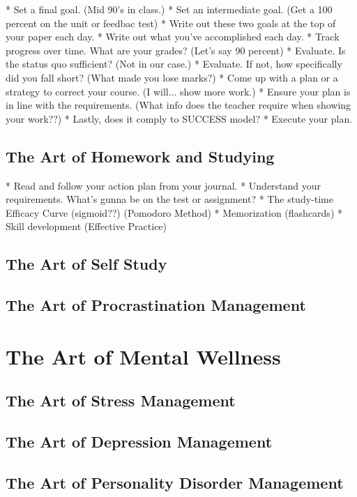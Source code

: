 \documentclass{book}
\begin{document}
* Set a final goal. (Mid 90's in class.)
* Set an intermediate goal. (Get a 100 percent on the unit or feedbac test)
* Write out these two goals at the top of your paper each day. 
* Write out what you've accomplished each day. 
* Track progress over time. What are your grades? (Let's say 90 percent)
* Evaluate. Is the status quo sufficient? (Not in our case.)
* Evaluate. If not, how specifically did you fall short? (What made you lose marks?)
* Come up with a plan or a strategy to correct your course. (I will... show more work.)
* Ensure your plan is in line with the requirements. (What info does the teacher require when showing your work??)
* Lastly, does it comply to SUCCESS model? 
* Execute your plan. 

\section{The Art of Homework and Studying}

* Read and follow your action plan from your journal. 
* Understand your requirements. What's gunna be on the test or assignment? 
* The study-time Efficacy Curve (sigmoid??) (Pomodoro Method)
* Memorization (flashcards)
* Skill development (Effective Practice)

\section{The Art of Self Study}

\section{The Art of Procrastination Management}

\chapter{The Art of Mental Wellness}

\section{The Art of Stress Management}

\section{The Art of Depression Management}

\section{The Art of Personality Disorder Management}
\end{document}
